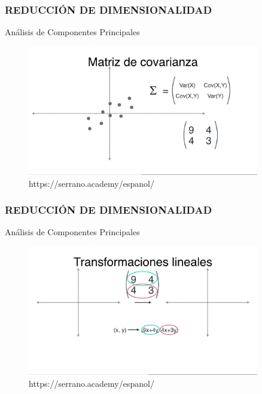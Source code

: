 \documentclass{beamer}
\begin{document}
\begin{frame}
\frametitle{REDUCCIÓN DE DIMENSIONALIDAD}
\begin{block}{Análisis de Componentes Principales}	
	\begin{figure}
		\includegraphics[width=0.9\textwidth]{PCA/IMG_3568.jpg}
		\caption{https://serrano.academy/espanol/}
	\end{figure}
\end{block}
\end{frame}

\begin{frame}
\frametitle{REDUCCIÓN DE DIMENSIONALIDAD}
\begin{block}{Análisis de Componentes Principales}	
	\begin{figure}
		\includegraphics[width=0.9\textwidth]{PCA/IMG_3569.jpg}
		\caption{https://serrano.academy/espanol/}
	\end{figure}
\end{block}
\end{frame}
\end{document}
